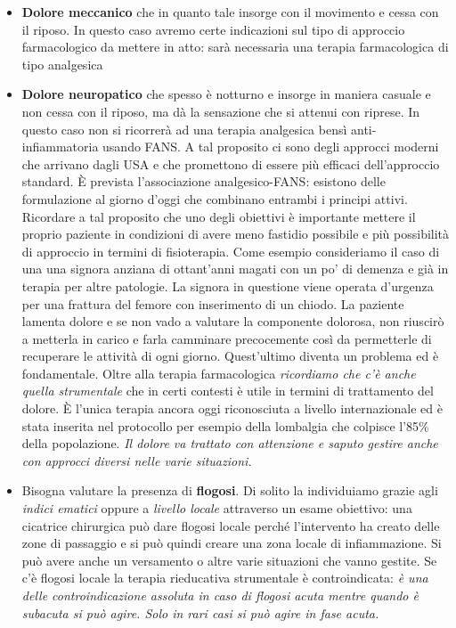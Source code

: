 \documentclass[]{article}
\begin{document}
\begin{itemize}
\item
  \textbf{Dolore meccanico} che in quanto tale insorge con il movimento
  e cessa con il riposo. In questo caso avremo certe indicazioni sul
  tipo di approccio farmacologico da mettere in atto: sarà necessaria
  una terapia farmacologica di tipo analgesica
\item
  \textbf{Dolore neuropatico} che spesso è notturno e insorge in maniera
  casuale e non cessa con il riposo, ma dà la sensazione che si attenui
  con riprese. In questo caso non si ricorrerà ad una terapia analgesica
  bensì anti-infiammatoria usando FANS. A tal proposito ci sono degli
  approcci moderni che arrivano dagli USA e che promettono di essere più
  efficaci dell'approccio standard. È prevista l'associazione
  analgesico-FANS: esistono delle formulazione al giorno d'oggi che
  combinano entrambi i principi attivi. Ricordare a tal proposito che
  uno degli obiettivi è importante mettere il proprio paziente in
  condizioni di avere meno fastidio possibile e più possibilità di
  approccio in termini di fisioterapia. Come esempio consideriamo il
  caso di una una signora anziana di ottant'anni magati con un po' di
  demenza e già in terapia per altre patologie. La signora in questione
  viene operata d'urgenza per una frattura del femore con inserimento di
  un chiodo. La paziente lamenta dolore e se non vado a valutare la
  componente dolorosa, non riuscirò a metterla in carico e farla
  camminare precocemente così da permetterle di recuperare le attività
  di ogni giorno. Quest'ultimo diventa un problema ed è fondamentale.
  Oltre alla terapia farmacologica \emph{ricordiamo che c'è anche quella
  strumentale} che in certi contesti è utile in termini di trattamento
  del dolore. È l'unica terapia ancora oggi riconosciuta a livello
  internazionale ed è stata inserita nel protocollo per esempio della
  lombalgia che colpisce l'85\% della popolazione. \emph{Il dolore va
  trattato con attenzione e saputo gestire anche con approcci diversi
  nelle varie situazioni.}
\end{itemize}

\begin{itemize}
\item
  Bisogna valutare la presenza di \textbf{flogosi}. Di solito la
  individuiamo grazie agli \emph{indici ematici} oppure a \emph{livello
  locale} attraverso un esame obiettivo: una cicatrice chirurgica può
  dare flogosi locale perché l'intervento ha creato delle zone di
  passaggio e si può quindi creare una zona locale di infiammazione. Si
  può avere anche un versamento o altre varie situazioni che vanno
  gestite. Se c'è flogosi locale la terapia rieducativa strumentale è
  controindicata: \emph{è una delle controindicazione assoluta in caso
  di flogosi acuta mentre quando è subacuta si può agire. Solo in rari
  casi si può agire in fase acuta. }
\end{itemize}
\end{document}
